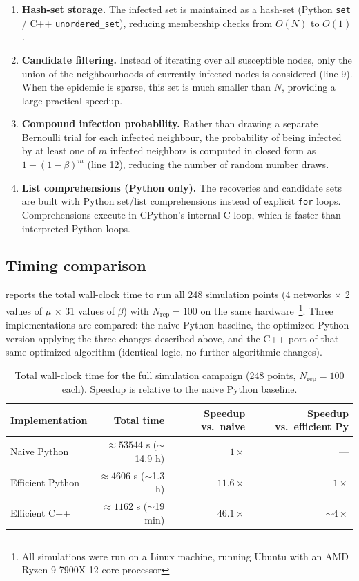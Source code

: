 \documentclass{article}
\begin{document}
\begin{enumerate}
    \item \textbf{Hash-set storage.} The infected set is maintained as a hash-set (Python \texttt{set} / C++ \texttt{unordered\_set}), reducing membership checks from $O(N)$ to $O(1)$.
    \item \textbf{Candidate filtering.} Instead of iterating over all susceptible nodes, only the union of the neighbourhoods of currently infected nodes is considered (line 9). When the epidemic is sparse, this set is much smaller than $N$, providing a large practical speedup.
    \item \textbf{Compound infection probability.} Rather than drawing a separate Bernoulli trial for each infected neighbour, the probability of being infected by at least one of $m$ infected neighbors is computed in closed form as $1-(1-\beta)^m$ (line 12), reducing the number of random number draws.
    \item \textbf{List comprehensions (Python only).} The recoveries and candidate sets are built with Python set/list comprehensions instead of explicit \texttt{for} loops. Comprehensions execute in CPython's internal C loop, which is faster than interpreted Python loops.
\end{enumerate}

\subsection{Timing comparison}


 reports the total wall-clock time to run all 248 simulation points (4 networks $\times$ 2 values of $\mu$ $\times$ 31 values of $\beta$) with $N_{\text{rep}} = 100$ on the same hardware~\footnote{All simulations were run on a Linux machine, running Ubuntu with an AMD Ryzen 9 7900X 12-core processor}. Three implementations are compared: the naive Python baseline, the optimized Python version applying the three changes described above, and the C++ port of that same optimized algorithm (identical logic, no further algorithmic changes).

\begin{table}[ht]
\centering
\begin{tabular}{lrrr}
    \toprule
    Implementation & Total time & Speedup vs.\ naive & Speedup vs.\ efficient Py \\
    \midrule
    Naive Python      & $\approx\!53544$ s ($\sim$14.9 h) & $1\times$    & ---         \\
    Efficient Python  & $\approx\!4606$ s ($\sim$1.3 h)   & $11.6\times$ & $1\times$   \\
    Efficient C++     & $\approx\!1162$ s ($\sim$19 min)  & $46.1\times$ & $\sim\!4\times$ \\
    \bottomrule
\end{tabular}
\caption{Total wall-clock time for the full simulation campaign (248 points, $N_{\text{rep}}=100$ each). Speedup is relative to the naive Python baseline.}
\label{tab:timing}
\end{table}
\end{document}
